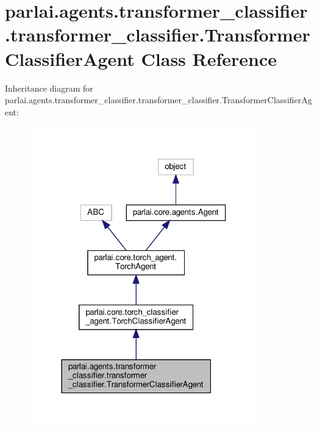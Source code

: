 \hypertarget{classparlai_1_1agents_1_1transformer__classifier_1_1transformer__classifier_1_1TransformerClassifierAgent}{}\section{parlai.\+agents.\+transformer\+\_\+classifier.\+transformer\+\_\+classifier.\+Transformer\+Classifier\+Agent Class Reference}
\label{classparlai_1_1agents_1_1transformer__classifier_1_1transformer__classifier_1_1TransformerClassifierAgent}


Inheritance diagram for parlai.\+agents.\+transformer\+\_\+classifier.\+transformer\+\_\+classifier.\+Transformer\+Classifier\+Agent\+:
\nopagebreak
\begin{figure}[H]
\begin{center}
\leavevmode
\includegraphics[width=282pt]{db/db7/classparlai_1_1agents_1_1transformer__classifier_1_1transformer__classifier_1_1TransformerClassifierAgent__inherit__graph}
\end{center}
\end{figure}


